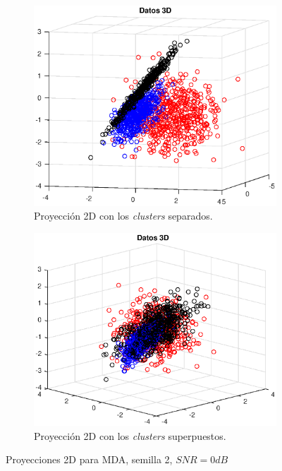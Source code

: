 \documentclass[11pt]{article} %
\begin{document}
\begin{figure}[h]
	\centering
	\begin{subfigure}[b]{0.435\textwidth}
		\includegraphics[width=\textwidth]{../21_seleccion/3_mda_0dB_separadas.eps}
		\caption[]{\small Proyección 2D con los \emph{clusters} separados.}
		\label{fig:select:0dB:mda_separate}
	\end{subfigure}
	\quad
	\begin{subfigure}[b]{0.435\textwidth}
		\includegraphics[width=\textwidth]{../21_seleccion/3_mda_0dB_superpuestas.eps}
		\caption[]{\small Proyección 2D con los \emph{clusters} superpuestos.}
		\label{fig:select:0dB:mda_overlaid}
	\end{subfigure}
	\caption{Proyecciones 2D para MDA, semilla 2, $SNR=0dB$}
\end{figure}
\end{document}
